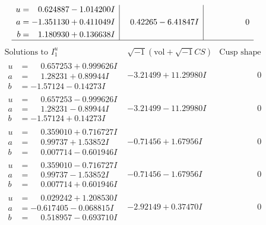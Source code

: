 \documentclass[1p]{elsarticle_modified}
\theoremstyle{definition}
\newcommand{\I}{\sqrt{-1}}
\begin{document}
$$\begin{array}{c|c|c}
\begin{aligned}
u &= \phantom{-}0.624887 - 1.014200 I \\
a &= -1.351130 + 0.411049 I \\
b &= \phantom{-}1.180930 + 0.136638 I\end{aligned}
 & \phantom{-}0.42265 - 6.41847 I & \phantom{-0.000000 } 0\\
 \hline 
 \end{array}$$\newpage$$\begin{array}{c|c|c}  
\text{Solutions to }I^u_{1}& \I (\text{vol} + \sqrt{-1}CS) & \text{Cusp shape}\\
 \hline 
\begin{aligned}
u &= \phantom{-}0.657253 + 0.999626 I \\
a &= \phantom{-}1.28231 + 0.89944 I \\
b &= -1.57124 - 0.14273 I\end{aligned}
 & -3.21499 + 11.29980 I & \phantom{-0.000000 } 0 \\ \hline\begin{aligned}
u &= \phantom{-}0.657253 - 0.999626 I \\
a &= \phantom{-}1.28231 - 0.89944 I \\
b &= -1.57124 + 0.14273 I\end{aligned}
 & -3.21499 - 11.29980 I & \phantom{-0.000000 } 0 \\ \hline\begin{aligned}
u &= \phantom{-}0.359010 + 0.716727 I \\
a &= \phantom{-}0.99737 + 1.53852 I \\
b &= \phantom{-}0.007714 - 0.601946 I\end{aligned}
 & -0.71456 + 1.67956 I & \phantom{-0.000000 } 0 \\ \hline\begin{aligned}
u &= \phantom{-}0.359010 - 0.716727 I \\
a &= \phantom{-}0.99737 - 1.53852 I \\
b &= \phantom{-}0.007714 + 0.601946 I\end{aligned}
 & -0.71456 - 1.67956 I & \phantom{-0.000000 } 0 \\ \hline\begin{aligned}
u &= \phantom{-}0.029242 + 1.208530 I \\
a &= -0.617405 - 0.068815 I \\
b &= \phantom{-}0.518957 - 0.693710 I\end{aligned}
 & -2.92149 + 0.37470 I & \phantom{-0.000000 } 0 \\ \hline\begin{aligned}

\end{aligned}
\end{array}$$
\end{document}
